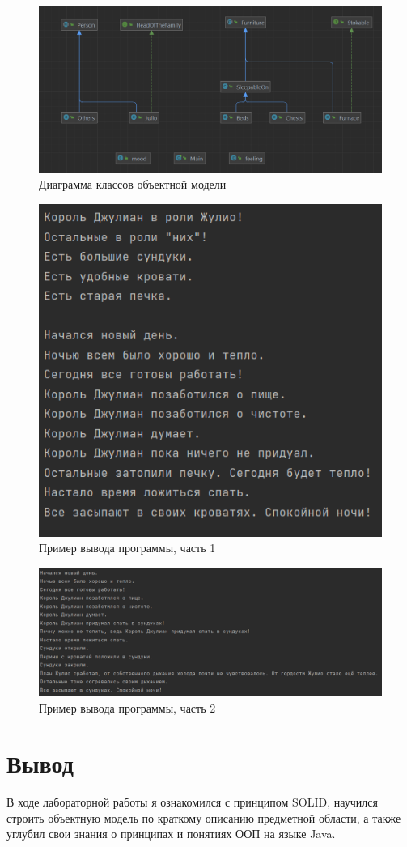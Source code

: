 \documentclass[12pt]{article}
\begin{document}
\begin{figure}[h]
    \centering
    \includegraphics[width=\linewidth]{image2.png}
    \caption{Диаграмма классов объектной модели}
\end{figure}

\begin{figure}[h]
    \centering
    \includegraphics[width=0.6\linewidth]{image3.png}
    \caption{Пример вывода программы, часть 1}
\end{figure}
\newpage
\begin{figure}[h]
    \centering
    \includegraphics[width=\linewidth]{image4.png}
    \caption{Пример вывода программы, часть 2}
\end{figure}

\newpage

\section{Вывод}

В ходе лабораторной работы я ознакомился с принципом SOLID, научился строить объектную модель по краткому описанию предметной области, а также углубил свои знания о принципах и понятиях ООП на языке Java.
\end{document}
